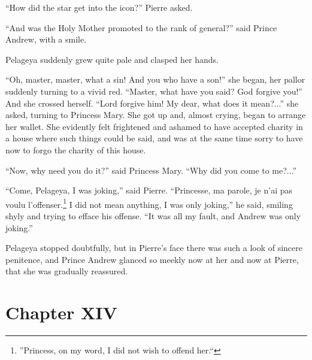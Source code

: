 ``How did the star get into the icon?'' Pierre asked.

``And was the Holy Mother promoted to the rank of general?'' said
Prince Andrew, with a smile.

Pelageya suddenly grew quite pale and clasped her hands.

``Oh, master, master, what a sin! And you who have a son!'' she
began, her pallor suddenly turning to a vivid red. ``Master, what
have you said? God forgive you!'' And she crossed herself. ``Lord
forgive him! My dear, what does it mean?...'' she asked, turning
to Princess Mary. She got up and, almost crying, began to arrange
her wallet. She evidently felt frightened and ashamed to have
accepted charity in a house where such things could be said, and
was at the same time sorry to have now to forgo the charity of
this house.

``Now, why need you do it?'' said Princess Mary. ``Why did you
come to me?...''

``Come, Pelageya, I was joking,'' said Pierre. ``Princesse, ma
parole, je n'ai pas voulu l'offenser.\footnote{''Princess, on my
word, I did not wish to offend her.``} I did not mean anything, I
was only joking,'' he said, smiling shyly and trying to efface
his offense. ``It was all my fault, and Andrew was only joking.''

Pelageya stopped doubtfully, but in Pierre's face there was such
a look of sincere penitence, and Prince Andrew glanced so meekly
now at her and now at Pierre, that she was gradually reassured.


\chapter*{Chapter XIV}
\ifaudio     
{} 
\fi


